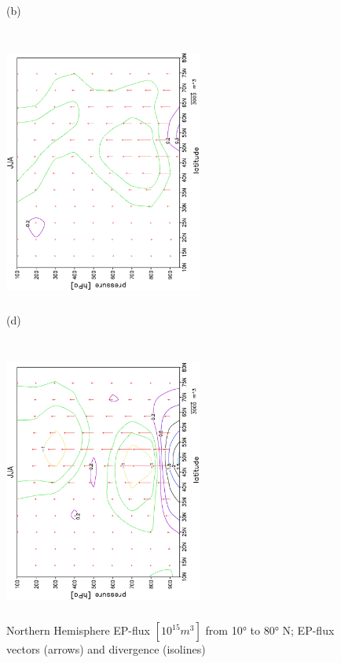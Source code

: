 \documentclass[12pt,a4paper,twoside,openright,headinclude,liststotoc,bibtotoc]{scrreprt}
\begin{document}
\begin{figure}[b]
{}
\parbox{8.5cm}{\hspace{0.90cm}\begin{scriptsize}(b)\end{scriptsize} \vspace{-0.5cm} \\
\includegraphics[height=8.5cm,width=6.5cm,angle=-90]
{eps/epjja.eps}
}
\parbox{8.5cm}{\hspace{0.90cm}\begin{scriptsize}(d)\end{scriptsize} \vspace{-0.5cm} \\
\includegraphics[height=8.5cm,width=6.5cm,angle=-90]
{eps/epjja_era40.eps}
}
\caption[EP-flux Northern Hemisphere for DJF and JJA]{Northern Hemisphere EP-flux $[10^{15} m^{3}]$ from 10° to 80° N; EP-flux vectors (arrows) and divergence (isolines)}
\label{img:ep}
\end{figure}
\end{document}
